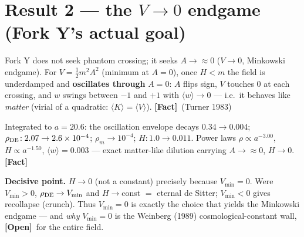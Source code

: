\documentclass[11pt]{article}
\newcommand{\Fact}{\textbf{\textcolor{green!45!black}{[Fact]}}}
\newcommand{\Open}{\textbf{\textcolor{gray!10!black}{[Open]}}}
\begin{document}
\section{Result 2 --- the $V\to0$ endgame (Fork Y's actual goal)}
Fork Y does not seek phantom crossing; it seeks $A\to\approx0$ ($V\to0$, Minkowski endgame). For $V=\tfrac12 m^2A^2$ (minimum at $A=0$), once $H<m$ the field is underdamped and \textbf{oscillates through} $A=0$: $A$ flips sign, $V$ touches $0$ at each crossing, and $w$ swings between $-1$ and $+1$ with $\langle w\rangle\to0$ --- i.e.\ it behaves like \emph{matter} (virial of a quadratic: $\langle K\rangle=\langle V\rangle$). \Fact\ (Turner 1983)

Integrated to $a=20.6$: the oscillation envelope decays $0.34\to0.004$; $\rho_{\rm DE}\!:2.07\to2.6\times10^{-4}$; $\rho_m\to10^{-4}$; $H\!:1.0\to0.011$. Power laws $\rho\propto a^{-3.00}$, $H\propto a^{-1.50}$, $\langle w\rangle=0.003$ --- exact matter-like dilution carrying $A\to\approx0$, $H\to0$. \Fact

\textbf{Decisive point.} $H\to0$ (not a constant) precisely because $V_{\min}=0$. Were $V_{\min}>0$, $\rho_{\rm DE}\to V_{\min}$ and $H\to$const $=$ eternal de Sitter; $V_{\min}<0$ gives recollapse (crunch). Thus $V_{\min}=0$ is exactly the choice that yields the Minkowski endgame --- and \emph{why} $V_{\min}=0$ is the Weinberg (1989) cosmological-constant wall, \Open\ for the entire field.
\end{document}

